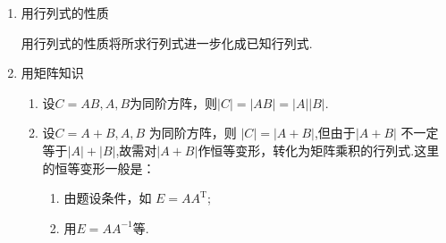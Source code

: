 \begin{enumerate}
    \item 用行列式的性质

          用行列式的性质将所求行列式进一步化成已知行列式.
    \item 用矩阵知识
          \begin{enumerate}
              \item 设$C=AB,A,B$为同阶方阵，则$|C|=|AB|=|A||B|.$
              \item 设$C=A+B,A,B$ 为同阶方阵，则 $|C|=|A+B|$,但由于$|A+B|$ 不一定等于$|A|+|B|$,故需对$|A+B|$作恒等变形，转化为矩阵乘积的行列式.这里的恒等变形一般是：
                    \begin{enumerate}
                        \item 由题设条件，如 $E=AA^\mathrm{T}$;
                        \item 用$E=AA^{-1}$等.
                    \end{enumerate}
          \end{enumerate}
\end{enumerate}